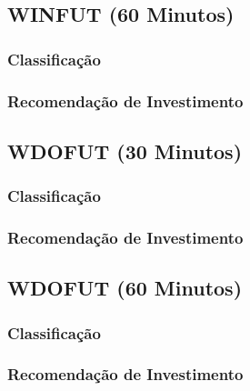 \subsection{WINFUT (60 Minutos)}
\subsubsection{Classificação}
\subsubsection{Recomendação de Investimento}

\subsection{WDOFUT (30 Minutos)}
\subsubsection{Classificação}
\subsubsection{Recomendação de Investimento}

\subsection{WDOFUT (60 Minutos)}
\subsubsection{Classificação}
\subsubsection{Recomendação de Investimento}



